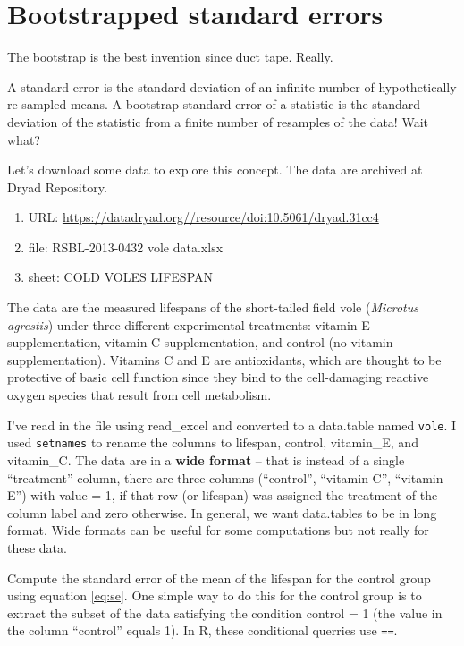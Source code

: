 \documentclass[]{book}
\providecommand{\tightlist}{%
  \setlength{\itemsep}{0pt}\setlength{\parskip}{0pt}}
\theoremstyle{definition}
\theoremstyle{definition}
\theoremstyle{definition}
\theoremstyle{remark}
\begin{document}
\section{Bootstrapped standard
errors}\label{bootstrapped-standard-errors}

The bootstrap is the best invention since duct tape. Really.

A standard error is the standard deviation of an infinite number of
hypothetically re-sampled means. A bootstrap standard error of a
statistic is the standard deviation of the statistic from a finite
number of resamples of the data! Wait what?

Let's download some data to explore this concept. The data are archived
at Dryad Repository.

\begin{enumerate}
\def\labelenumi{\arabic{enumi}.}
\tightlist
\item
  URL: \url{https://datadryad.org//resource/doi:10.5061/dryad.31cc4}
\item
  file: RSBL-2013-0432 vole data.xlsx
\item
  sheet: COLD VOLES LIFESPAN
\end{enumerate}

The data are the measured lifespans of the short-tailed field vole
(\emph{Microtus agrestis}) under three different experimental
treatments: vitamin E supplementation, vitamin C supplementation, and
control (no vitamin supplementation). Vitamins C and E are antioxidants,
which are thought to be protective of basic cell function since they
bind to the cell-damaging reactive oxygen species that result from cell
metabolism.

I've read in the file using read\_excel and converted to a data.table
named \texttt{vole}. I used \texttt{setnames} to rename the columns to
lifespan, control, vitamin\_E, and vitamin\_C. The data are in a
\textbf{wide format} -- that is instead of a single ``treatment''
column, there are three columns (``control'', ``vitamin C'', ``vitamin
E'') with value = 1, if that row (or lifespan) was assigned the
treatment of the column label and zero otherwise. In general, we want
data.tables to be in long format. Wide formats can be useful for some
computations but not really for these data.

Compute the standard error of the mean of the lifespan for the control
group using equation \eqref{eq:se}. One simple way to do this for the
control group is to extract the subset of the data satisfying the
condition control = 1 (the value in the column ``control'' equals 1). In
R, these conditional querries use \texttt{==}.
\end{document}
